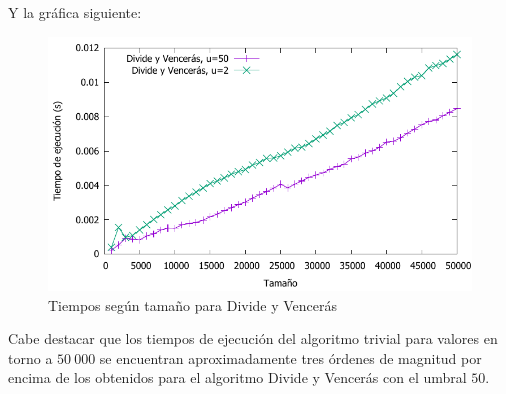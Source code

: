 \vspace*{1cm}

Y la gráfica siguiente:

\begin{figure}[H]\includegraphics[width=14cm]{img/comparativa_preferencias_grande.pdf} \centering
	\caption{Tiempos según tamaño para Divide y Vencerás}
\end{figure}

Cabe destacar que los tiempos de ejecución del algoritmo trivial para valores en torno a $50\ 000$ se encuentran aproximadamente tres órdenes de magnitud por encima de los obtenidos para el algoritmo Divide y Vencerás con el umbral $50$.
